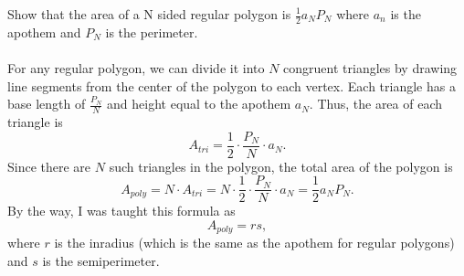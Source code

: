 \documentclass[12pt]{exam}
\begin{document}
\begin{questions}
\newpage 
\question 
Show that the area of a N sided regular polygon is $\frac{1}{2}a_NP_N$ where 
$a_n$ is the apothem and $P_N$ is the perimeter.
\\\\
For any regular polygon, we can divide it into $N$ congruent triangles
by drawing line segments from the center of the polygon to each vertex.
Each triangle has a base length of $\frac{P_N}{N}$ and height equal to the apothem $a_N$.
Thus, the area of each triangle is
\[
  A_{tri} = \frac{1}{2} \cdot \frac{P_N}{N} \cdot a_N.
\]
Since there are $N$ such triangles in the polygon, the total area of the polygon is
\[
  A_{poly} = N \cdot A_{tri} = N \cdot \frac{1}{2} \cdot \frac{P_N}{N} \cdot a_N = \frac{1}{2} a_N P_N.
\]
By the way, I was taught this formula as
\[
  A_{poly} = rs,
\]
where $r$ is the inradius (which is the same as the apothem for regular polygons)
and $s$ is the semiperimeter.

\end{questions}
\end{document}
